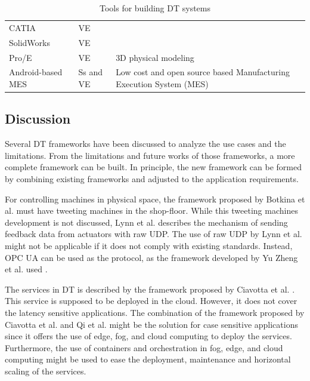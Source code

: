\documentclass[article,table]{aaltoseries}
\begin{document}
\begin{table}[]
\begin{tabular}{|p{3.8cm}|p{1.5cm}|p{5.8cm}|}
		CATIA                                                        & VE             &                                                                                         \\ \cline{1-2}
		SolidWorks                                                   & VE             &                                                                                         \\ \cline{1-2}
		Pro/E                                                        & VE             & \multirow{-3}{*}{3D physical modeling}                                                  \\ \hline
		Android-based MES \cite{UrbinaCoronado2018} & Ss and VE      & Low cost and open source based Manufacturing Execution System (MES)                     \\ \hline
	\end{tabular}
	\caption{Tools for building DT systems}
	\label{tab:table_tools}
\end{table}

\subsection{Discussion}
Several DT frameworks have been discussed to analyze the use cases and the limitations. From the limitations and future works of those frameworks, a more complete framework can be built. In principle, the new framework can be formed by combining existing frameworks and adjusted to the application requirements.

For controlling machines in physical space, the framework proposed by Botkina et al. \cite{botkina2018digital} must have tweeting machines in the shop-floor. While this tweeting machines development is not discussed, Lynn et al. \cite{lynn2018realization} describes the mechanism of sending feedback data from actuators with raw UDP. The use of raw UDP by Lynn et al. might not be applicable if it does not comply with existing standards. Instead, OPC UA can be used as the protocol, as the framework developed by Yu Zheng et al. used \cite{zheng2019application}.

The services in DT is described by the framework proposed by Ciavotta et al. \cite{ciavotta2017microservice}. This service is supposed to be deployed in the cloud. However, it does not cover the latency sensitive applications. The combination of the framework proposed by Ciavotta et al. and Qi et al. \cite{qi2018modeling} might be the solution for case sensitive applications since it offers the use of edge, fog, and cloud computing to deploy the services. Furthermore, the use of containers and orchestration in fog, edge, and cloud computing might be used to ease the deployment, maintenance and horizontal scaling of the services. 
\end{document}
